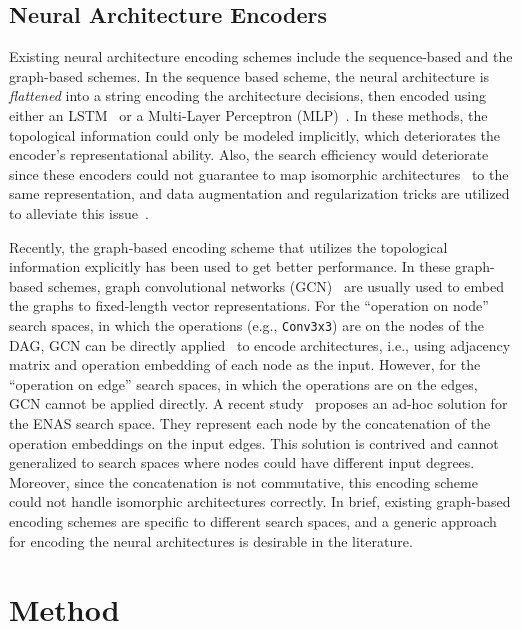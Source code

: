 \documentclass[runningheads]{llncs}
\begin{document}
\subsection{Neural Architecture Encoders}


Existing neural architecture encoding schemes include the sequence-based and the graph-based schemes.
In the sequence based scheme, the neural architecture is {\it flattened} into a string encoding the architecture decisions, then encoded using either an LSTM~\cite{nao2018,liu2018progressive,wang2018alphax} or a Multi-Layer Perceptron (MLP)~\cite{liu2018progressive,wang2018alphax}. 
In these methods, the topological information could only be modeled implicitly, which deteriorates the encoder's representational ability. 
Also, the search efficiency would deteriorate since these encoders could not guarantee to map isomorphic architectures~\cite{ying2019bench,stagge2000neural} to the same representation, and data augmentation and regularization tricks are utilized to alleviate this issue~\cite{nao2018}.


Recently, the graph-based encoding scheme that utilizes the topological information explicitly has been used to get better performance. In these graph-based schemes,
graph convolutional networks (GCN)~\cite{kipf2016semi} are usually used to embed the graphs to fixed-length vector representations. For the ``operation on node'' search spaces, in which the operations (e.g., \texttt{Conv3x3}) are on the nodes of the DAG,
GCN can be directly applied~\cite{shi2019multi} to encode architectures, i.e., using adjacency matrix and operation embedding of each node as the input. 
However, for the ``operation on edge'' search spaces, 
in which the operations are on the edges, GCN cannot be applied directly.
A recent study~\cite{guo2019nat} proposes an ad-hoc solution for the ENAS search space. They represent each node by the concatenation of the operation embeddings on the input edges. This solution is contrived and cannot generalized to search spaces where nodes could have different input degrees. Moreover, since the concatenation is not commutative, this encoding scheme could not handle isomorphic architectures correctly.
In brief, existing graph-based encoding schemes are specific to different search spaces, 
and a generic approach for encoding the neural architectures is desirable in the literature.




\section{Method}
\label{sec:napp}
\end{document}
